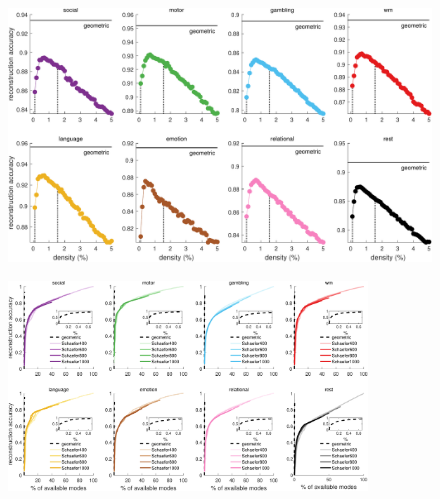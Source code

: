 \documentclass[sn-mathphys-num]{sn-jnl}%
\theoremstyle{thmstyleone}%
\theoremstyle{thmstyletwo}%
\theoremstyle{thmstylethree}%
\begin{document}
\begin{appendices}
\begin{figure}[!htb] 
	\centering
	\includegraphics[width=1.0\textwidth]{fig/supp_7.pdf}
	\caption{
	} \label{fig:supp_7}
\end{figure}


\begin{figure}[!htb] 
	\centering
	\includegraphics[width=0.85\textwidth]{fig/supp_8.pdf}
	\caption{
	} \label{fig:supp_8}
\end{figure}



\end{appendices}
\end{document}
